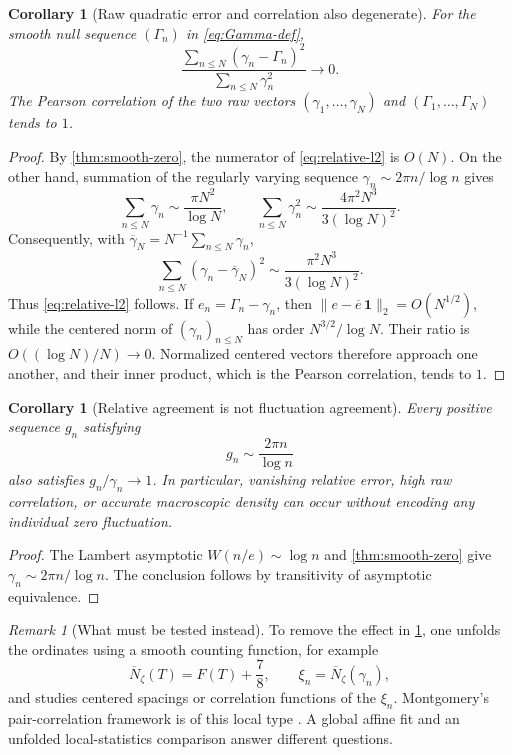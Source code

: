 \documentclass[11pt]{article}
\newtheorem{corollary}[theorem]{Corollary}
\theoremstyle{definition}
\theoremstyle{remark}
\newtheorem{remark}[theorem]{Remark}
\begin{document}
\begin{corollary}[Raw quadratic error and correlation also degenerate]\label{cor:raw-metrics}
For the smooth null sequence $(\Gamma_n)$ in \eqref{eq:Gamma-def},
\begin{equation}\label{eq:relative-l2}
    \frac{\sum_{n\le N}(\gamma_n-\Gamma_n)^2}
         {\sum_{n\le N}\gamma_n^2}
    \longrightarrow0.
\end{equation}
The Pearson correlation of the two raw vectors
$(\gamma_1,\ldots,\gamma_N)$ and $(\Gamma_1,\ldots,\Gamma_N)$ tends to $1$.
\end{corollary}

\begin{proof}
By \cref{thm:smooth-zero}, the numerator of \eqref{eq:relative-l2} is $O(N)$.  On the other hand, summation of the regularly varying sequence $\gamma_n\sim2\pi n/\log n$ gives
\[
    \sum_{n\le N}\gamma_n
      \sim\frac{\pi N^2}{\log N},
    \qquad
    \sum_{n\le N}\gamma_n^2
      \sim\frac{4\pi^2N^3}{3(\log N)^2}.
\]
Consequently, with $\overline\gamma_N=N^{-1}\sum_{n\le N}\gamma_n$,
\[
    \sum_{n\le N}(\gamma_n-\overline\gamma_N)^2
    \sim\frac{\pi^2N^3}{3(\log N)^2}.
\]
Thus \eqref{eq:relative-l2} follows.  If $e_n=\Gamma_n-\gamma_n$, then
$\|e-\overline e\,\mathbf1\|_2=O(N^{1/2})$, while the centered norm of $(\gamma_n)_{n\le N}$ has order $N^{3/2}/\log N$.  Their ratio is $O((\log N)/N)\to0$.  Normalized centered vectors therefore approach one another, and their inner product, which is the Pearson correlation, tends to $1$.
\end{proof}

\begin{corollary}[Relative agreement is not fluctuation agreement]\label{cor:relative-not-fluctuation}
Every positive sequence $g_n$ satisfying
\[
    g_n\sim\frac{2\pi n}{\log n}
\]
also satisfies $g_n/\gamma_n\to1$.  In particular, vanishing relative error, high raw correlation, or accurate macroscopic density can occur without encoding any individual zero fluctuation.
\end{corollary}

\begin{proof}
The Lambert asymptotic $W(n/e)\sim\log n$ and \cref{thm:smooth-zero} give $\gamma_n\sim2\pi n/\log n$.  The conclusion follows by transitivity of asymptotic equivalence.
\end{proof}

\begin{remark}[What must be tested instead]\label{rem:unfolding}
To remove the effect in \cref{cor:relative-not-fluctuation}, one unfolds the ordinates using a smooth counting function, for example
\[
    \overline N_\zeta(T)=F(T)+\frac78,
    \qquad
    \xi_n=\overline N_\zeta(\gamma_n),
\]
and studies centered spacings or correlation functions of the $\xi_n$.  Montgomery's pair-correlation framework is of this local type \citep{Montgomery1973}.  A global affine fit and an unfolded local-statistics comparison answer different questions.
\end{remark}
\end{document}
